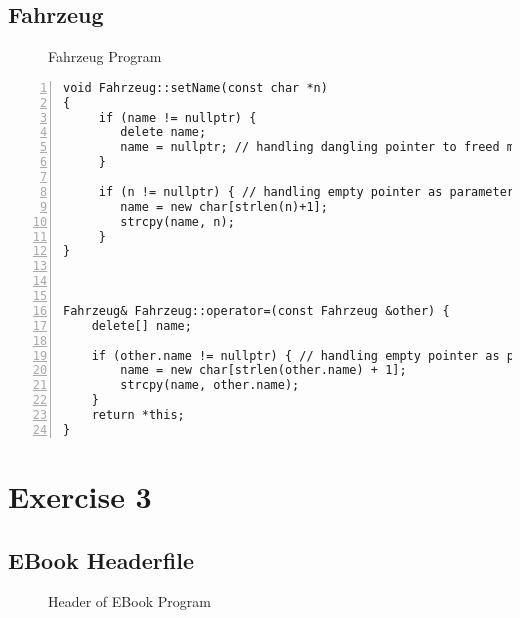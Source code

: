 \documentclass{article}
\begin{document}
\subsection{Fahrzeug }
\begin{figure}
\scriptsize{\caption{Fahrzeug Program}}
\end{figure}
\begin{lstlisting}[basicstyle=\footnotesize\ttfamily, numbers=left, stepnumber=1, numberstyle = \normalsize]
void Fahrzeug::setName(const char *n)
{
     if (name != nullptr) {
     	delete name;
     	name = nullptr; // handling dangling pointer to freed memory
     }

     if (n != nullptr) { // handling empty pointer as parameter, preventing strlen from crashing
     	name = new char[strlen(n)+1];
     	strcpy(name, n);
     }
}



Fahrzeug& Fahrzeug::operator=(const Fahrzeug &other) {
	delete[] name;

	if (other.name != nullptr) { // handling empty pointer as parameter, preventing strlen from crashing
		name = new char[strlen(other.name) + 1];
		strcpy(name, other.name);
	}
	return *this;
}

\end{lstlisting}

\newpage
\section{Exercise 3}
\subsection{EBook Headerfile}
\begin{figure}
\scriptsize{\caption{Header of EBook Program}}
\end{figure}
\end{document}
